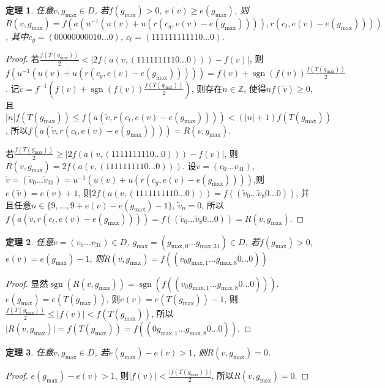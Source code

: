 \documentclass[12pt]{ctexart}
\DeclareMathOperator{\sgn}{sgn}
\newtheorem{theorem}{定理}
\begin{document}
\begin{theorem}
    任意$v,g_{\text{max}}\in D$, 若$f(g_{\text{max}})>0$, $e(v)\geqslant e(g_{\text{max}})$, 则$R(v,g_{\text{max}})=f(a(u^{-1}(u(v)+u(r(c_g,e(v)-e(g_{\text{max}})))),r(c_t,e(v)-e(g_{\text{max}}))))$, 其中$c_g=(00000000010\dots0)$, $c_t=(111111111110\dots0)$.
\end{theorem}
\begin{proof}
    若$\frac{f(T(g_{\text{max}}))}{2}<\vert2f(a(v,(1111111110\dots0)))-f(v)\vert$, 则$f(u^{-1}(u(v)+u(r(c_g,e(v)-e(g_{\text{max}})))))=f(v)+\sgn(f(v))\frac{f(T(g_{\text{max}}))}{2}$. 记$\tilde{v}=f^{-1}(f(v)+\sgn(f(v))\frac{f(T(g_{\text{max}}))}{2})$, 则存在$n\in \mathbb{Z}$, 使得$nf(\tilde{v})\geqslant0$,且$\vert n\vert f(T(g_{\text{max}}))\leqslant f(a(\tilde{v},r(c_t,e(v)-e(g_{\text{max}}))))<(\vert n\vert+1)f(T(g_{\text{max}}))$, 所以$f(a(\tilde{v},r(c_t,e(v)-e(g_{\text{max}}))))=R(v,g_{\text{max}})$.

    若$\frac{f(T(g_{\text{max}}))}{2}\geqslant\vert2f(a(v,(1111111110\dots0)))-f(v)\vert$, 则$R(v,g_{\text{max}})=2f(a(v,(1111111110\dots0)))$. 设$v=(v_0\dots v_{31})$, $\tilde{v}=(\tilde{v}_0\dots \tilde{v}_{31})=u^{-1}(u(v)+u(r(c_g,e(v)-e(g_{\text{max}}))))$,则$e(\tilde{v})=e(v)+1$, 则$2f(a(v,(1111111110\dots0)))=f((\tilde{v}_0\dots\tilde{v}_8 0\dots0))$, 并且任意$n\in\{9,\dots,9+e(v)-e(g_{\text{max}})-1\}$, $\tilde{v}_n=0$, 所以$f(a(\tilde{v},r(c_t,e(v)-e(g_{\text{max}}))))=f((\tilde{v}_0\dots\tilde{v}_8 0\dots0))=R(v,g_{\text{max}})$.
\end{proof}

\begin{theorem}
    任意$v=(v_0\dots v_{31})\in D$, $g_{\text{max}}=(g_{\text{max},0}\dots g_{\text{max},31})\in D$, 若$f(g_{\text{max}})>0$, $e(v)=e(g_{\text{max}})-1$, 则$R(v,g_{\text{max}})=f((v_0g_{\text{max},1}\dots g_{\text{max},8}0\dots0))$
\end{theorem}
\begin{proof}
    显然$\sgn(R(v,g_{\text{max}}))=\sgn(f((v_0g_{\text{max},1}\dots g_{\text{max},8}0\dots0)))$. $e(g_{\text{max}})=e(T(g_{\text{max}}))$, 则$e(v)=e(T(g_{\text{max}}))-1$, 则$\frac{f(T(g_{\text{max}}))}{2}\leqslant \vert f(v)\vert<f(T(g_{\text{max}}))$, 所以$\vert R(v,g_{\text{max}})\vert=f(T(g_{\text{max}}))=f((0g_{\text{max},1}\dots g_{\text{max},8}0\dots0))$.
\end{proof}

\begin{theorem}
    任意$v,g_{\text{max}}\in D$, 若$e(g_{\text{max}})-e(v)>1$, 则$R(v,g_{\text{max}})=0$.
\end{theorem}
\begin{proof}
    $e(g_{\text{max}})-e(v)>1$, 则$\vert f(v)\vert<\frac{\vert f(T(g_{\text{max}}))\vert}{2}$, 所以$R(v,g_{\text{max}})=0$.
\end{proof}
\end{document}
